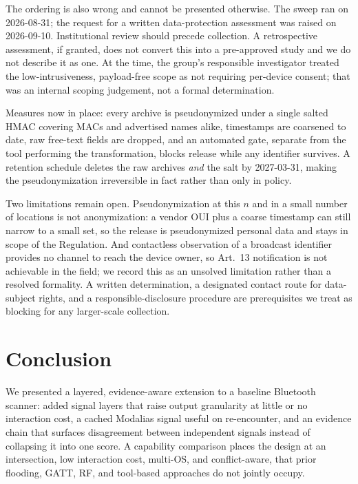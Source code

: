 \documentclass[conference]{IEEEtran}
\begin{document}
The ordering is also wrong and cannot be presented otherwise. The sweep ran on
2026-08-31; the request for a written data-protection assessment was raised on
2026-09-10. Institutional review should precede collection. A retrospective
assessment, if granted, does not convert this into a pre-approved study and we
do not describe it as one. At the time, the group's responsible investigator
treated the low-intrusiveness, payload-free scope as not requiring per-device
consent; that was an internal scoping judgement, not a formal determination.

Measures now in place: every archive is pseudonymized under a single salted
HMAC covering MACs and advertised names alike, timestamps are coarsened to
date, raw free-text fields are dropped, and an automated gate, separate from
the tool performing the transformation, blocks release while any identifier
survives. A retention schedule deletes the raw archives \emph{and} the salt by
2027-03-31, making the pseudonymization irreversible in fact rather than only
in policy.

Two limitations remain open. Pseudonymization at this $n$ and in a small
number of locations is not anonymization: a vendor OUI plus a coarse timestamp
can still narrow to a small set, so the release is pseudonymized personal data
and stays in scope of the Regulation. And contactless observation of a
broadcast identifier provides no channel to reach the device owner, so
Art.~13 notification is not achievable in the field; we record this as an
unsolved limitation rather than a resolved formality. A written
determination, a designated contact route for data-subject rights, and a
responsible-disclosure procedure are prerequisites we treat as blocking for
any larger-scale collection.

\section{Conclusion}\label{sec:conclusion}
We presented a layered, evidence-aware extension to a baseline Bluetooth
scanner: added signal layers that raise output granularity at little or no
interaction cost, a cached Modalias signal useful on re-encounter, and an
evidence chain that surfaces disagreement between independent signals instead
of collapsing it into one score. A capability comparison places the design at
an intersection, low interaction cost, multi-OS, and conflict-aware, that
prior flooding, GATT, RF, and tool-based approaches do not jointly occupy.
\end{document}
